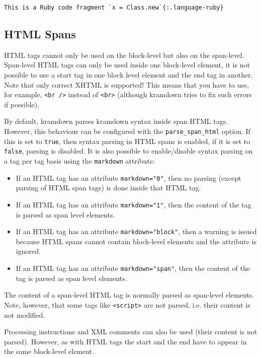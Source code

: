 \documentclass[a4paper]{article}
\begin{document}
\begin{verbatim}
This is a Ruby code fragment `x = Class.new`{:.language-ruby}
\end{verbatim}

\hypertarget{html-spans}{\subsection{HTML Spans}\label{html-spans}}

HTML tags cannot only be used on the block-level but also on the
span-level. Span-level HTML tags can only be used inside one block-level
element, it is not possible to use a start tag in one block level
element and the end tag in another. Note that only correct XHTML is
supported! This means that you have to use, for example,
\texttt{\textless{}br\ /\textgreater{}} instead of
\texttt{\textless{}br\textgreater{}} (although kramdown tries to fix
such errors if possible).

By default, kramdown parses kramdown syntax inside span HTML tags.
However, this behaviour can be configured with the
\texttt{parse\_span\_html} option. If this is set to \texttt{true}, then
syntax parsing in HTML spans is enabled, if it is set to \texttt{false},
parsing is disabled. It is also possible to enable/disable syntax
parsing on a tag per tag basis using the \texttt{markdown} attribute:

\begin{itemize}
\item
  If an HTML tag has an attribute \texttt{markdown="0"}, then no parsing
  (except parsing of HTML span tags) is done inside that HTML tag.
\item
  If an HTML tag has an attribute \texttt{markdown="1"}, then the
  content of the tag is parsed as span level elements.
\item
  If an HTML tag has an attribute \texttt{markdown="block"}, then a
  warning is issued because HTML spans cannot contain block-level
  elements and the attribute is ignored.
\item
  If an HTML tag has an attribute \texttt{markdown="span"}, then the
  content of the tag is parsed as span level elements.
\end{itemize}

The content of a span-level HTML tag is normally parsed as span-level
elements. Note, however, that some tags like
\texttt{\textless{}script\textgreater{}} are not parsed, i.e. their
content is not modified.

Processing instructions and XML comments can also be used (their content
is not parsed). However, as with HTML tags the start and the end have to
appear in the same block-level element.
\end{document}
